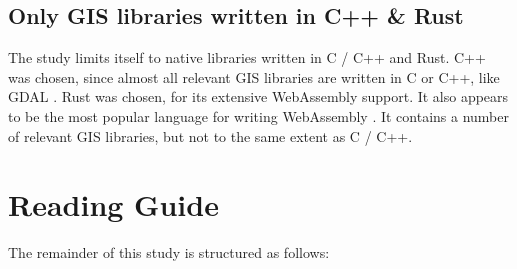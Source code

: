 
 
\subsection*{Only GIS libraries written in C++ \& Rust}

The study limits itself to native libraries written in C / C++ and Rust. 
C++ was chosen, since almost all relevant GIS libraries are written in C or C++, like GDAL \citep{dohler_gdal_2022}. 
Rust was chosen, for its extensive WebAssembly support. 
It also appears to be the most popular language for writing WebAssembly \citep{eberhardt_state_2022}.
It contains a number of relevant GIS libraries, but not to the same extent as C / C++.


\section{Reading Guide}
The remainder of this study is structured as follows:

